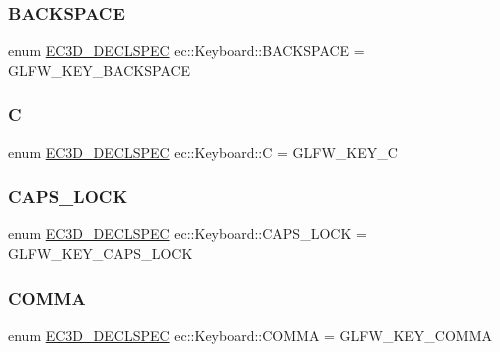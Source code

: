 \subsubsection{\texorpdfstring{B\+A\+C\+K\+S\+P\+A\+CE}{BACKSPACE}}
{\footnotesize\ttfamily enum \mbox{\hyperlink{_common_8h_aac42573e202ca3dd4d259c81691e2369}{E\+C3\+D\+\_\+\+D\+E\+C\+L\+S\+P\+EC}} ec\+::\+Keyboard\+::\+B\+A\+C\+K\+S\+P\+A\+CE = G\+L\+F\+W\+\_\+\+K\+E\+Y\+\_\+\+B\+A\+C\+K\+S\+P\+A\+CE}

\mbox{\label{classec_1_1_keyboard_afdb55905c629366fca7f4b8b342d7925}} 
\subsubsection{\texorpdfstring{C}{C}}
{\footnotesize\ttfamily enum \mbox{\hyperlink{_common_8h_aac42573e202ca3dd4d259c81691e2369}{E\+C3\+D\+\_\+\+D\+E\+C\+L\+S\+P\+EC}} ec\+::\+Keyboard\+::C = G\+L\+F\+W\+\_\+\+K\+E\+Y\+\_\+C}

\mbox{\label{classec_1_1_keyboard_a3a83cb31b400e7191b369470b5a04207}} 
\subsubsection{\texorpdfstring{C\+A\+P\+S\+\_\+\+L\+O\+CK}{CAPS\_LOCK}}
{\footnotesize\ttfamily enum \mbox{\hyperlink{_common_8h_aac42573e202ca3dd4d259c81691e2369}{E\+C3\+D\+\_\+\+D\+E\+C\+L\+S\+P\+EC}} ec\+::\+Keyboard\+::\+C\+A\+P\+S\+\_\+\+L\+O\+CK = G\+L\+F\+W\+\_\+\+K\+E\+Y\+\_\+\+C\+A\+P\+S\+\_\+\+L\+O\+CK}

\mbox{\label{classec_1_1_keyboard_aa40289b5c2768f80103cd5cbd89f3158}} 
\subsubsection{\texorpdfstring{C\+O\+M\+MA}{COMMA}}
{\footnotesize\ttfamily enum \mbox{\hyperlink{_common_8h_aac42573e202ca3dd4d259c81691e2369}{E\+C3\+D\+\_\+\+D\+E\+C\+L\+S\+P\+EC}} ec\+::\+Keyboard\+::\+C\+O\+M\+MA = G\+L\+F\+W\+\_\+\+K\+E\+Y\+\_\+\+C\+O\+M\+MA}


